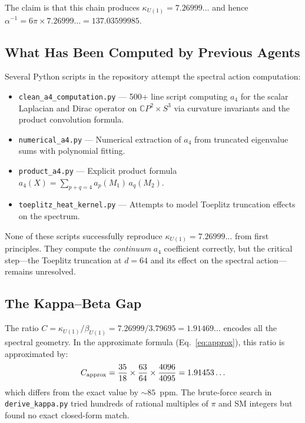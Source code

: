 \documentclass[11pt]{article}
\begin{document}
The claim is that this chain produces $\kappa_{U(1)} = 7.26999\ldots$
and hence $\alpha^{-1} = 6\pi \times 7.26999\ldots = 137.03599985$.

\subsection{What Has Been Computed by Previous Agents}

Several Python scripts in the repository attempt the spectral action
computation:
\begin{itemize}
\item \texttt{clean\_a4\_computation.py} --- 500+ line script computing
  $a_4$ for the scalar Laplacian and Dirac operator on $\mathbb{C}P^2 \times S^3$
  via curvature invariants and the product convolution formula.
\item \texttt{numerical\_a4.py} --- Numerical extraction of $a_4$ from
  truncated eigenvalue sums with polynomial fitting.
\item \texttt{product\_a4.py} --- Explicit product formula
  $a_4(X) = \sum_{p+q=4} a_p(M_1)\,a_q(M_2)$.
\item \texttt{toeplitz\_heat\_kernel.py} --- Attempts to model Toeplitz
  truncation effects on the spectrum.
\end{itemize}

None of these scripts successfully reproduce $\kappa_{U(1)} = 7.26999\ldots$
from first principles. They compute the \emph{continuum} $a_4$ coefficient
correctly, but the critical step---the Toeplitz truncation at $d = 64$
and its effect on the spectral action---remains unresolved.

\subsection{The Kappa--Beta Gap}

The ratio $C = \kappa_{U(1)}/\beta_{U(1)} = 7.26999/3.79695 = 1.91469\ldots$
encodes all the spectral geometry. In the approximate formula
(Eq.~\ref{eq:approx}), this ratio is approximated by:
\begin{equation}
C_{\rm approx} = \frac{35}{18} \times \frac{63}{64} \times \frac{4096}{4095}
= 1.91453\ldots
\end{equation}
which differs from the exact value by $\sim 85$~ppm. The brute-force search
in \texttt{derive\_kappa.py} tried hundreds of rational multiples of $\pi$
and SM integers but found no exact closed-form match.

\end{document}
